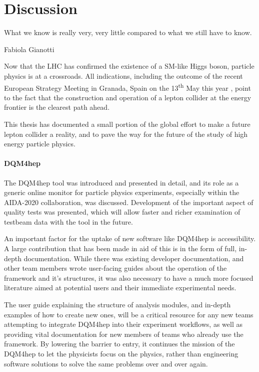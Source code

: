 \chapter{Discussion}
\label{chapter:discussion}

\epigraph{What we know is really very, very little compared to what we still have to know.}{Fabiola Gianotti}

Now that the \acrlong{LHC} has confirmed the existence of a \acrlong{SM}-like Higgs boson, particle physics is at a crossroads. All indications, including the outcome of the recent European Strategy Meeting in Granada, Spain on the 13\textsuperscript{th} May this year \cite{european-strategy}, point to the fact that the construction and operation of a lepton collider at the energy frontier is the clearest path ahead.

This thesis has documented a small portion of the global effort to make a future lepton collider a reality, and to pave the way for the future of the study of high energy particle physics.

\subsubsection*{DQM4hep}
The \acrfull{DQM4hep} tool was introduced and presented in detail, and its role as a generic online monitor for particle physics experiments, especially within the \acrshort{AIDA}-2020 collaboration, was discussed. Development of the important aspect of quality tests was presented, which will allow faster and richer examination of testbeam data with the tool in the future.

An important factor for the uptake of new software like \acrshort{DQM4hep} is accessibility. A large contribution that has been made in aid of this is in the form of full, in-depth documentation. While there was existing developer documentation, and other team members wrote user-facing guides about the operation of the framework and it's structures, it was also necessary to have a much more focused literature aimed at potential users and their immediate experimental needs.

The user guide explaining the structure of analysis modules, and in-depth examples of how to create new ones, will be a critical resource for any new teams attempting to integrate \acrshort{DQM4hep} into their experiment workflows, as well as providing vital documentation for new members of teams who already use the framework. By lowering the barrier to entry, it continues the mission of the \acrshort{DQM4hep} to let the physicists focus on the physics, rather than engineering software solutions to solve the same problems over and over again.

